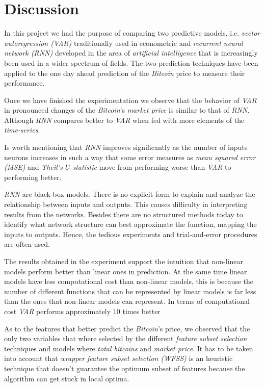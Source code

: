
\chapter{Discussion}
\label{ch:discussion}

In this project we had the purpose of comparing two predictive models,
i.e. \textit{vector autoregression (VAR)} traditionally used in
econometric and \textit{recurrent neural network (RNN)} developed in
the area of \textit{artificial intelligence} that is increasingly been
used in a wider spectrum of fields. The two prediction techniques have
been applied to the one day ahead prediction of the \textit{Bitcoin}
price to measure their performance.

Once we have finished the experimentation we observe that the behavior
of \textit{VAR} in pronounced changes of the \textit{Bitcoin}'s
\textit{market price} is similar to that of \textit{RNN}. Although
\textit{RNN} compares better to \textit{VAR} when fed with more
elements of the \textit{time-series}.

Is worth mentioning that \textit{RNN} improves significantly as the
number of inputs neurons increases in such a way that some error
measures as \textit{mean squared error (MSE)} and \textit{Theil's $U$
statistic} move from performing worse than \textit{VAR} to performing
better.

\textit{RNN} are black-box models. There is no explicit form to
explain and analyze the relationship between inputs and outputs. This
causes difficulty in interpreting results from the networks. Besides
there are no structured methods today to identify what network
structure can best approximate the function, mapping the inputs to
outputs. Hence, the tedious experiments and trial-and-error procedures
are often used.

The results obtained in the experiment support the intuition that
non-linear models perform better than linear ones in prediction. At
the same time linear models have less computational cost than
non-linear models, this is because the number of different functions
that can be represented by linear models is far less than the ones
that non-linear models can represent. In terms of computational cost
\textit{VAR} performs approximately 10 times better

As to the features that better predict the \textit{Bitcoin}'s price,
we observed that the only two variables that where selected by the
different \textit{feature subset selection} techniques and models
where \textit{total bitcoins} and \textit{market price}. It has to be
taken into account that \textit{wrapper feature subset selection
(WFSS)} is an heuristic technique that doesn't guarantee the optimum
subset of features because the algorithm can get stuck in local
optima.

